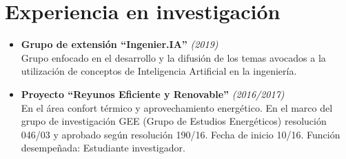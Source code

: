 
\section*{{\faBook} Experiencia en investigación}

\begin{itemize}
	\item \textbf{Grupo de extensión ``Ingenier.IA''} \textit{(2019)} \\
	      Grupo enfocado en el desarrollo y la difusión de los temas avocados a la utilización de
	      conceptos de Inteligencia Artificial en la ingeniería.
	\item \textbf{Proyecto ``Reyunos Eficiente y Renovable''} \textit{(2016/2017)} \\
	      En el área confort térmico y aprovechamiento energético. En el marco del grupo de
	      investigación GEE (Grupo de Estudios Energéticos) resolución 046/03 y aprobado según
	      resolución 190/16. Fecha de inicio 10/16. Función desempeñada: Estudiante investigador.
\end{itemize}
